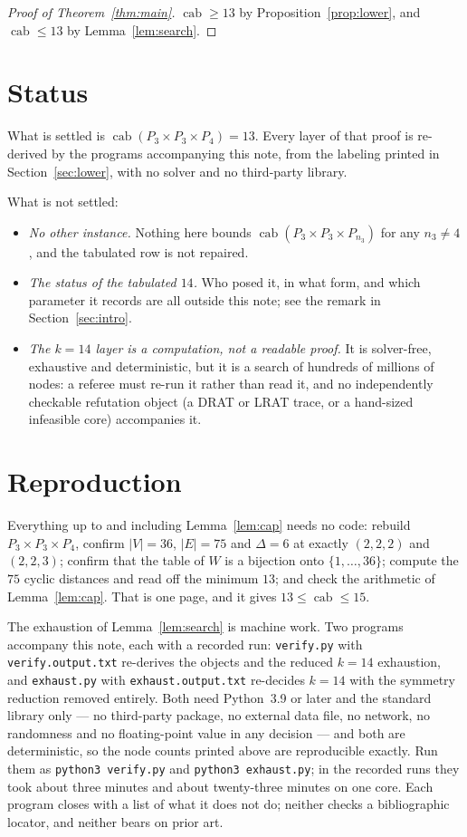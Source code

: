 \documentclass[11pt]{amsart}
\theoremstyle{remark}
\DeclareMathOperator{\cab}{cab}
\begin{document}
\begin{proof}[Proof of Theorem~\ref{thm:main}]
$\cab\ge13$ by Proposition~\ref{prop:lower}, and $\cab\le13$ by Lemma~\ref{lem:search}.
\end{proof}

\section{Status}\label{sec:status}

What is settled is $\cab(P_3\times P_3\times P_4)=13$. Every layer of that proof is re-derived by
the programs accompanying this note, from the labeling printed in Section~\ref{sec:lower}, with no
solver and no third-party library.

What is not settled:
\begin{itemize}
\item \emph{No other instance.} Nothing here bounds $\cab(P_3\times P_3\times P_{n_3})$ for any
      $n_3\ne4$, and the tabulated row is not repaired.
\item \emph{The status of the tabulated $14$.} Who posed it, in what form, and which parameter it
      records are all outside this note; see the remark in Section~\ref{sec:intro}.
\item \emph{The $k=14$ layer is a computation, not a readable proof.} It is solver-free,
      exhaustive and deterministic, but it is a search of hundreds of millions of nodes: a referee
      must re-run it rather than read it, and no independently checkable refutation object (a DRAT
      or LRAT trace, or a hand-sized infeasible core) accompanies it.
\end{itemize}

\section{Reproduction}

Everything up to and including Lemma~\ref{lem:cap} needs no code: rebuild
$P_3\times P_3\times P_4$, confirm $|V|=36$, $|E|=75$ and $\Delta=6$ at exactly $(2,2,2)$ and
$(2,2,3)$; confirm that the table of $W$ is a bijection onto $\{1,\dots,36\}$; compute the $75$
cyclic distances and read off the minimum $13$; and check the arithmetic of Lemma~\ref{lem:cap}.
That is one page, and it gives $13\le\cab\le15$.

The exhaustion of Lemma~\ref{lem:search} is machine work. Two programs accompany this note, each
with a recorded run: \texttt{verify.py} with \texttt{verify.output.txt} re-derives the objects and
the reduced $k=14$ exhaustion, and \texttt{exhaust.py} with \texttt{exhaust.output.txt} re-decides
$k=14$ with the symmetry reduction removed entirely. Both need Python~3.9 or later and the standard
library only --- no third-party package, no external data file, no network, no randomness and no
floating-point value in any decision --- and both are deterministic, so the node counts printed
above are reproducible exactly. Run them as \texttt{python3 verify.py} and
\texttt{python3 exhaust.py}; in the recorded runs they took about three minutes and about
twenty-three minutes on one core. Each program closes with a list of what it does not do; neither
checks a bibliographic locator, and neither bears on prior art.
\end{document}
